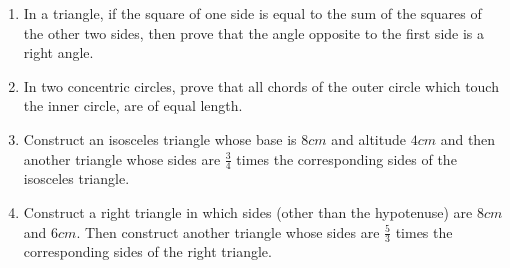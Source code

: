 \begin{enumerate}
\item In a triangle, if the square of one side is equal to the sum of the squares of the other two sides, then prove that the angle opposite to the first side is a right angle.

\item In two concentric circles, prove that all chords of the outer circle which touch the inner circle, are of equal length.

\item Construct an isosceles triangle whose base is $8 cm$ and altitude $4 cm$ and then another triangle whose sides are $\frac{3}{4}$ times the corresponding sides of the isosceles triangle.

\item Construct a right triangle in which sides (other than the hypotenuse) are $8 cm$ and $6 cm$. Then construct another triangle whose sides are $\frac{5}{3}$ times the corresponding sides of the right triangle.

\end{enumerate}	

